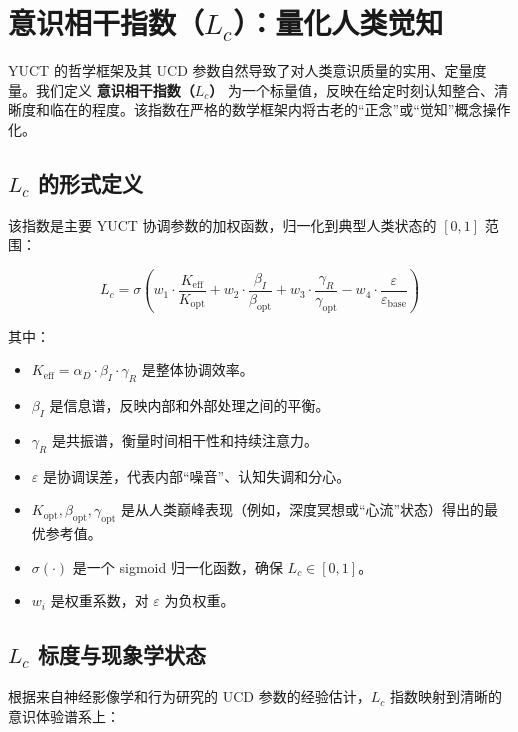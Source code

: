 \documentclass[12pt,a4paper]{article}
\begin{document}
	\section{意识相干指数（\(L_c\)）：量化人类觉知}
	
	YUCT 的哲学框架及其 UCD 参数自然导致了对人类意识质量的实用、定量度量。我们定义 \textbf{意识相干指数（\(L_c\)）} 为一个标量值，反映在给定时刻认知整合、清晰度和临在的程度。该指数在严格的数学框架内将古老的“正念”或“觉知”概念操作化。
	
	\subsection{\(L_c\) 的形式定义}
	
	该指数是主要 YUCT 协调参数的加权函数，归一化到典型人类状态的 \([0, 1]\) 范围：
	
	\begin{equation}
		L_c = \sigma\left( w_1 \cdot \frac{K_{\mathrm{eff}}}{K_{\mathrm{opt}}} + w_2 \cdot \frac{\beta_I}{\beta_{\mathrm{opt}}} + w_3 \cdot \frac{\gamma_R}{\gamma_{\mathrm{opt}}} - w_4 \cdot \frac{\varepsilon}{\varepsilon_{\mathrm{base}}} \right)
	\end{equation}
	
	其中：
	\begin{itemize}
		\item \(K_{\mathrm{eff}} = \alpha_D \cdot \beta_I \cdot \gamma_R\) 是整体协调效率。
		\item \(\beta_I\) 是信息谱，反映内部和外部处理之间的平衡。
		\item \(\gamma_R\) 是共振谱，衡量时间相干性和持续注意力。
		\item \(\varepsilon\) 是协调误差，代表内部“噪音”、认知失调和分心。
		\item \(K_{\mathrm{opt}}, \beta_{\mathrm{opt}}, \gamma_{\mathrm{opt}}\) 是从人类巅峰表现（例如，深度冥想或“心流”状态）得出的最优参考值。
		\item \(\sigma(\cdot)\) 是一个 sigmoid 归一化函数，确保 \(L_c \in [0, 1]\)。
		\item \(w_i\) 是权重系数，对 \(\varepsilon\) 为负权重。
	\end{itemize}
	
	\subsection{\(L_c\) 标度与现象学状态}
	
	根据来自神经影像学和行为研究的 UCD 参数的经验估计，\(L_c\) 指数映射到清晰的意识体验谱系上：
	
\end{document}
